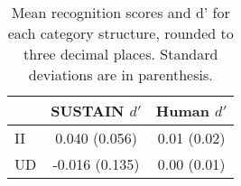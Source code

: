 \begin{table}[h]

\caption{\label{tab:recognition}Mean recognition scores and d' for each category
    structure, rounded to three decimal places. Standard deviations are in
    parenthesis.}
\centering
\begin{tabular}[t]{lcc}
\hline
&  SUSTAIN $d'$ & Human $d'$\\
\hline
II & 0.040 (0.056) & 0.01 (0.02)\\
UD & -0.016 (0.135) & 0.00 (0.01)\\
\hline
\end{tabular}
\end{table}
